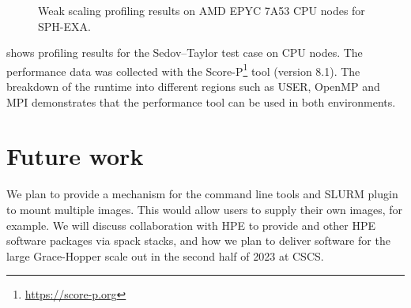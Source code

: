 \begin{figure}[htp!]
    \begin{center}
        
    \end{center}
    \caption{Weak scaling profiling results on AMD EPYC 7A53 CPU nodes for SPH-EXA.}
    \label{fig:sph-weak-scorep}
\end{figure}

 shows profiling results for the Sedov--Taylor test case on CPU nodes.
The performance data was collected with the Score-P\footnote{\url{https://score-p.org}} tool (version 8.1).
The breakdown of the runtime into different regions such as USER, OpenMP and MPI demonstrates that the performance tool can be used in both environments.


\section{Future work}

We plan to provide a mechanism for the command line tools and SLURM plugin to mount multiple images.
This would allow users to supply their own images, for example.
We will discuss collaboration with HPE to provide \craympich and other HPE software packages via spack stacks, and how we plan to deliver software for the large Grace-Hopper scale out in the second half of 2023 at CSCS.

